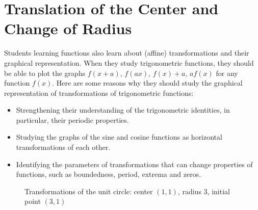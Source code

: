 
\chapter{Translation of the Center and Change of Radius}\label{ch.translated}


Students learning functions also learn about (affine) transformations and their graphical representation.
When they study trigonometric functions, they should be able to plot the graphs $f(x + a)$, $f(ax)$, $f(x)+a$, $af(x)$ for any function $f(x)$.
Here are some reasons why they should study the graphical representation of transformations of trigonometric functions:
\begin{itemize}
\item Strengthening their understanding of the trigonometric identities, in particular, their periodic properties.
\item Studying the graphs of the sine and cosine functions as horizontal transformations of each other.
\item Identifying the parameters of transformations that can change properties of functions, such as boundedness, period, extrema and zeros.
\end{itemize}

\begin{wrapfigure}[19]{r}{.5\textwidth}
\begin{center}
\vspace{-4ex}
\caption{Transformations of the unit circle: center $(1,1)$, radius $3$, initial point $(3,1)$}\label{fig.transformations-of-the-unit-circle}
\end{center}
\end{wrapfigure}

